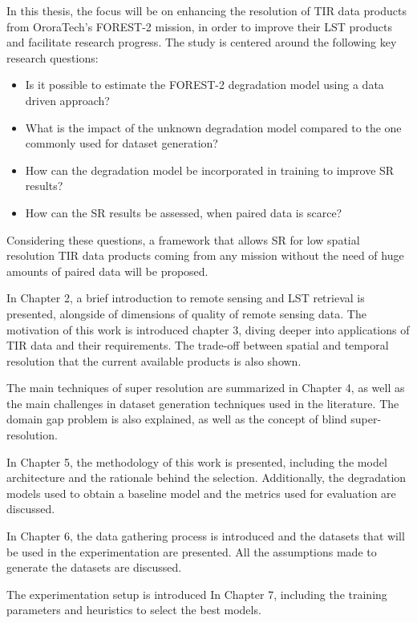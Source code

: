 In this thesis, the focus will be on enhancing the resolution of TIR data products from OroraTech's FOREST-2 mission, in order to improve their LST products and facilitate research progress. The study is centered around the following key research questions:

\begin{itemize}
    \item Is it possible to estimate the FOREST-2 degradation model using a data driven approach?
    \item What is the impact of the unknown degradation model compared to the one commonly used for dataset generation?
    \item How can the degradation model be incorporated in training to improve SR results?
    \item  How can the SR results be assessed, when paired data is scarce?
\end{itemize}

Considering these questions, a framework that allows SR for low spatial resolution TIR data products coming from any mission without the need of huge amounts of paired data will be proposed.
 
In Chapter 2, a brief introduction to remote sensing and LST retrieval is presented, alongside of dimensions of quality of remote sensing data. The motivation of this work is introduced chapter 3, diving deeper into applications of TIR data and their requirements. The trade-off between spatial and temporal resolution that the current available products is also shown.

The main techniques of super resolution are summarized in Chapter 4, as well as the main challenges in dataset generation techniques used in the literature.
The domain gap problem is also explained, as well as the concept of blind super-resolution.

In Chapter 5,  the methodology of this work is presented, including the model architecture and the rationale behind the selection. Additionally, the degradation models used to obtain a baseline model and the metrics used for evaluation are discussed.

In Chapter 6, the data gathering process is introduced and the datasets that will be used in the experimentation are presented. All the assumptions made to generate the datasets are discussed.

The experimentation setup is introduced In Chapter 7, including the training parameters and heuristics to select the best models.

